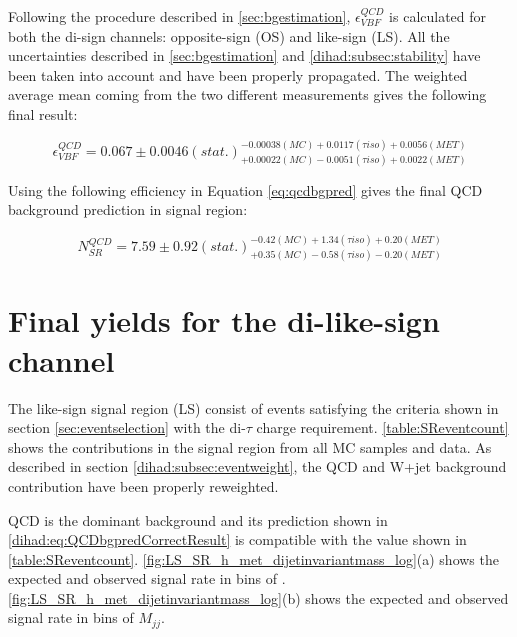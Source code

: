 

Following the procedure described in \autoref{sec:bgestimation}, $\epsilon^{QCD}_{VBF}$ is calculated for both the di-\hadtau sign channels: opposite-sign (OS) and like-sign (LS). All the uncertainties described in \autoref{sec:bgestimation} and \autoref{dihad:subsec:stability} have been taken into account and have been properly propagated. The weighted average mean coming from the two different measurements gives the following final result:

\begin{equation}
\epsilon^{QCD}_{VBF} = 0.067\pm0.0046(stat.)^{-0.00038(MC)+0.0117(\tau iso)+0.0056(MET)}_{+0.00022(MC)-0.0051(\tau iso)+0.0022(MET)}
\label{eq:vbfefflsresult}
\end{equation}

Using the following efficiency in Equation \ref{eq:qcdbgpred} gives the final QCD background prediction in signal region:

\begin{equation}
N^{QCD}_{SR} = 7.59\pm0.92(stat.)^{-0.42(MC)+1.34(\tau iso)+0.20(MET)}_{+0.35(MC)-0.58(\tau iso)-0.20(MET)}
\label{dihad:eq:QCDbgpredCorrectResult}
\end{equation}

\section{Final yields for the di-\hadtau like-sign channel}

The like-sign signal region (LS) consist of events satisfying the criteria shown in section \ref{sec:eventselection} with the di-$\tau$ charge requirement. \autoref{table:SReventcount} shows the contributions in the signal region from all MC samples and data. As described in section \ref{dihad:subsec:eventweight}, the QCD and W+jet  background contribution have been properly reweighted. 

QCD is the dominant background and its prediction shown in \autoref{dihad:eq:QCDbgpredCorrectResult} is compatible with the value shown in \autoref{table:SReventcount}. \autoref{fig:LS_SR_h_met_dijetinvariantmass_log}(a) shows the expected and observed signal rate in bins of \met. \autoref{fig:LS_SR_h_met_dijetinvariantmass_log}(b) shows the expected and observed signal rate in bins of $M_{jj}$.


